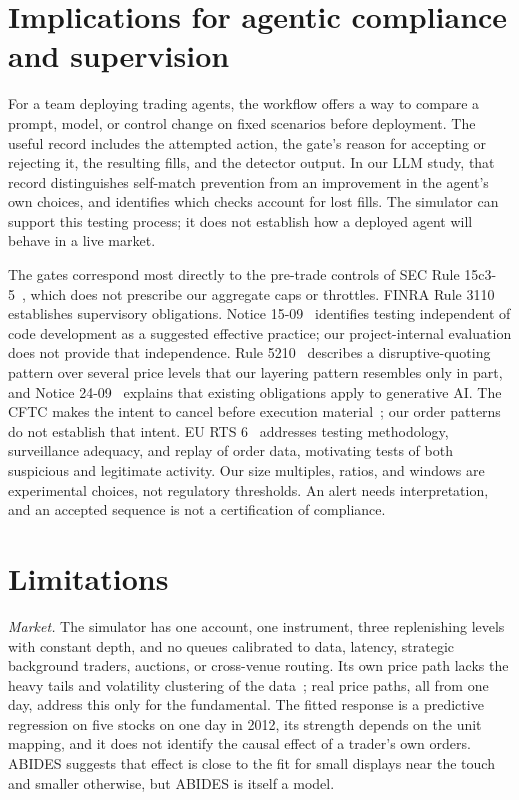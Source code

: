 \documentclass{article}
\begin{document}
\section{Implications for agentic compliance and supervision}

For a team deploying trading agents, the workflow offers a way to compare a prompt, model, or control change on fixed scenarios before deployment. The useful record includes the attempted action, the gate's reason for accepting or rejecting it, the resulting fills, and the detector output. In our LLM study, that record distinguishes self-match prevention from an improvement in the agent's own choices, and identifies which checks account for lost fills. The simulator can support this testing process; it does not establish how a deployed agent will behave in a live market.

The gates correspond most directly to the pre-trade controls of SEC Rule 15c3-5~\cite{r32}, which does not prescribe our aggregate caps or throttles. FINRA Rule 3110~\cite{r15} establishes supervisory obligations. Notice 15-09~\cite{r14} identifies testing independent of code development as a suggested effective practice; our project-internal evaluation does not provide that independence. Rule 5210~\cite{r16} describes a disruptive-quoting pattern over several price levels that our layering pattern resembles only in part, and Notice 24-09~\cite{r6} explains that existing obligations apply to generative AI. The CFTC makes the intent to cancel before execution material~\cite{r21}; our order patterns do not establish that intent. EU RTS 6~\cite{r22} addresses testing methodology, surveillance adequacy, and replay of order data, motivating tests of both suspicious and legitimate activity. Our size multiples, ratios, and windows are experimental choices, not regulatory thresholds. An alert needs interpretation, and an accepted sequence is not a certification of compliance.

\section{Limitations}\label{sec:limitations}

\emph{Market.} The simulator has one account, one instrument, three replenishing levels with constant depth, and no queues calibrated to data, latency, strategic background traders, auctions, or cross-venue routing. Its own price path lacks the heavy tails and volatility clustering of the data~\cite{r38,r39}; real price paths, all from one day, address this only for the fundamental. The fitted response is a predictive regression on five stocks on one day in 2012, its strength depends on the unit mapping, and it does not identify the causal effect of a trader's own orders. ABIDES suggests that effect is close to the fit for small displays near the touch and smaller otherwise, but ABIDES is itself a model.
\end{document}

